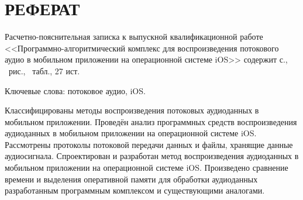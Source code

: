 \setupsectionstar
\section*{РЕФЕРАТ}

Расчетно-пояснительная записка к выпускной квалификационной работе
<<Программно-алгоритмический комплекс для воспроизведения потокового аудио в мобильном приложении на операционной системе iOS>> 
содержит \pageref{LastPage} с., \totalfigures\ рис., \totaltables\ табл., 27 ист.

Ключевые слова: потоковое аудио, iOS.

Классифицированы методы воспроизведения потоковых аудиоданных в мобильном приложении. 
Проведён анализ программных средств воспроизведения аудиоданных в мобильном приложении на операционной системе iOS.
Рассмотрены протоколы потоковой передачи данных и файлы, хранящие данные аудиосигнала.
Спроектирован и разработан метод воспроизведения аудиоданных в мобильном приложении на операционной системе iOS.
Произведено сравнение времени и выделения оперативной памяти для обработки аудиоданных разработанным программным комплексом и существующими аналогами.

\pagebreak